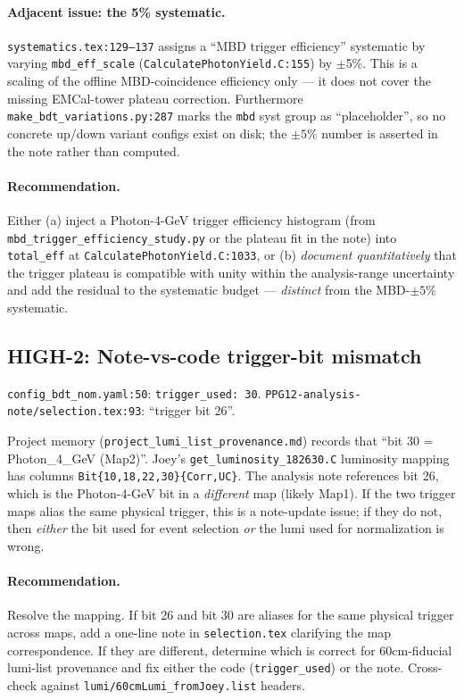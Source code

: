\documentclass[11pt,a4paper]{article}
\begin{document}
\paragraph{Adjacent issue: the 5\% systematic.}
\texttt{systematics.tex:129--137} assigns a ``MBD trigger efficiency''
systematic by varying \texttt{mbd\_eff\_scale}
(\texttt{CalculatePhotonYield.C:155}) by $\pm$5\%. This is a scaling
of the offline MBD-coincidence efficiency only --- it does not cover
the missing EMCal-tower plateau correction. Furthermore
\texttt{make\_bdt\_variations.py:287} marks the \texttt{mbd} syst group
as ``placeholder'', so no concrete up/down variant configs exist on
disk; the $\pm 5\%$ number is asserted in the note rather than computed.

\paragraph{Recommendation.} Either (a) inject a Photon-4-GeV trigger
efficiency histogram (from \texttt{mbd\_trigger\_efficiency\_study.py}
or the plateau fit in the note) into \texttt{total\_eff} at
\texttt{CalculatePhotonYield.C:1033}, or (b) \emph{document
quantitatively} that the trigger plateau is compatible with unity
within the analysis-range uncertainty and add the residual to the
systematic budget --- \emph{distinct} from the MBD-$\pm 5\%$
systematic.

\subsection{HIGH-2: Note-vs-code trigger-bit mismatch}

\texttt{config\_bdt\_nom.yaml:50}: \texttt{trigger\_used: 30}.
\texttt{PPG12-analysis-note/selection.tex:93}: ``trigger bit 26''.

\noindent Project memory (\texttt{project\_lumi\_list\_provenance.md})
records that ``bit 30 = Photon\_4\_GeV (Map2)''. Joey's
\texttt{get\_luminosity\_182630.C} luminosity mapping has columns
\texttt{Bit\{10,18,22,30\}\{Corr,UC\}}. The analysis note references
bit 26, which is the Photon-4-GeV bit in a \emph{different} map
(likely Map1). If the two trigger maps alias the same physical trigger,
this is a note-update issue; if they do not, then \emph{either} the bit
used for event selection \emph{or} the lumi used for normalization is
wrong.

\paragraph{Recommendation.} Resolve the mapping. If bit 26 and bit 30
are aliases for the same physical trigger across maps, add a one-line
note in \texttt{selection.tex} clarifying the map correspondence. If
they are different, determine which is correct for 60cm-fiducial
lumi-list provenance and fix either the code (\texttt{trigger\_used})
or the note. Cross-check against
\texttt{lumi/60cmLumi\_fromJoey.list} headers.
\end{document}
